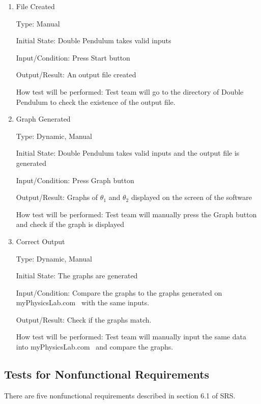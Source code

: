 \documentclass[12pt, titlepage]{article}
\begin{document}
\begin{enumerate}

\item{File Created}  

Type: Manual
          
Initial State: Double Pendulum takes valid inputs
          
Input/Condition: Press Start button
          
Output/Result: An output file created 
          
How test will be performed: Test team will go to the directory of Double
Pendulum to check the existence of the output file.
          
\item{Graph Generated} 

Type: Dynamic, Manual 
          
Initial State: Double Pendulum takes valid inputs and the output file is
generated
          
Input/Condition: Press Graph button 
          
Output/Result: Graphs of $\theta_1$ and $\theta_2$ displayed on the screen of
the software
          
How test will be performed: Test team will manually press the Graph button and
check if the graph is displayed

\item{Correct Output}  

Type: Dynamic, Manual 
          
Initial State: The graphs are generated 
          
Input/Condition: Compare the graphs to the graphs generated on
myPhysicsLab.com~\cite{Double_Pendulum} with the same inputs.
          
Output/Result: Check if the graphs match.
          
How test will be performed: Test team will manually input the same data into
myPhysicsLab.com~\cite{Double_Pendulum} and compare the graphs.

\end{enumerate}

\subsection{Tests for Nonfunctional Requirements}

There are five nonfunctional requirements described in section 6.1 of SRS.
\end{document}
